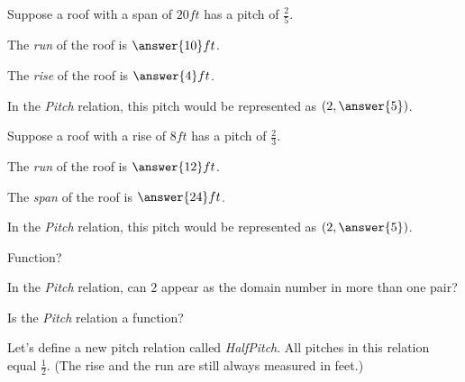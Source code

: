 \documentclass{ximera}
\begin{document}
\begin{question}

Suppose a roof with a span of $20 ft$ has a pitch of $\frac{2}{5}$.  

The \textit{run} of the roof is $\answer{10} ft$.

The \textit{rise} of the roof is $\answer{4} ft$.

In the \textit{Pitch} relation, this pitch would be represented as $\left( 2, \answer{5} \right)$.

\end{question}











\begin{question}

Suppose a roof with a rise of $8 ft$ has a pitch of $\frac{2}{3}$.  

The \textit{run} of the roof is $\answer{12} ft$.

The \textit{span} of the roof is $\answer{24} ft$.

In the \textit{Pitch} relation, this pitch would be represented as $\left( 2, \answer{5} \right)$.

\end{question}



\begin{exercise}  Function?

In the \textit{Pitch} relation, can $2$ appear as the domain number in more than one pair?
\begin{multipleChoice}
\end{multipleChoice}





Is the \textit{Pitch} relation a function?
\begin{multipleChoice}
\end{multipleChoice}

\end{exercise}




Let's define a new pitch relation called \textit{HalfPitch}.  All pitches in this relation equal $\frac{1}{2}$.  (The rise and the run are still always measured in feet.)
\end{document}
